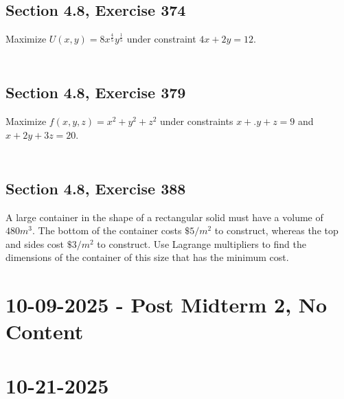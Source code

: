 \documentclass[]{mangos-musings}
\begin{document}
\subsection{Section 4.8, Exercise 374}
Maximize $U(x, y) = 8x^{\frac{4}{5}} y^{\frac{1}{5}}$ under constraint $4x + 2y = 12$.
\begin{align*}
  \\ \\ \\
\end{align*}
\subsection{Section 4.8, Exercise 379}
Maximize $f(x, y, z) = x^2 + y^2 + z^2$ under constraints $x +.y + z = 9$ and $x + 2y + 3z = 20$.
\begin{align*}
  \\ \\ \\
\end{align*}
\subsection{Section 4.8, Exercise 388}
A large container in the shape of a rectangular solid must have a volume of $480 m^3$. The bottom of the container costs $\$5/m^2$ to construct, whereas the top and sides cost $\$3 /m^2$ to construct. Use Lagrange multipliers to find the dimensions of the container of this size that has the minimum cost.


\newpage
\section{10-09-2025 - Post Midterm 2, No Content}

\newpage
\section{10-21-2025}
\end{document}
